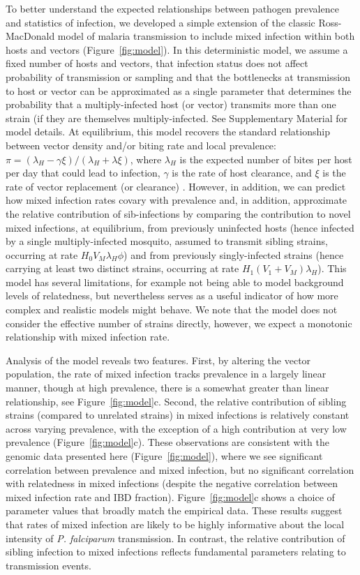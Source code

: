 \documentclass[9pt,lineno]{elife}
\begin{document}
To better understand the expected relationships between pathogen prevalence and statistics of infection, we developed a simple extension of the classic Ross-MacDonald model \citep{Smith2012} of malaria transmission to include mixed infection within both hosts and vectors (Figure~\ref{fig:model}). In this deterministic model, we assume a fixed number of hosts and vectors, that infection status does not affect probability of transmission or sampling and that the bottlenecks at transmission to host or vector can be approximated as a single parameter that determines the probability that a multiply-infected host (or vector) transmits more than one strain (if they are themselves multiply-infected.  See Supplementary Material for model details.  At equilibrium, this model recovers the standard relationship between vector density and/or biting rate and local prevalence: $\pi = (\lambda_H - \gamma \xi)/(\lambda_H + \lambda \xi)$, where $\lambda_H$ is the expected number of bites per host per day that could lead to infection, $\gamma$ is the rate of host clearance, and $\xi$ is the rate of vector replacement (or clearance) .  However, in addition, we  can predict how mixed infection rates covary with prevalence and, in addition, approximate the relative contribution of sib-infections by comparing the contribution to novel mixed infections, at equilibrium, from previously uninfected hosts (hence infected by a single multiply-infected mosquito, assumed to transmit sibling strains, occurring at rate $H_0 V_M \lambda_H \phi$) and from previously singly-infected strains (hence carrying at least two distinct strains, occurring at rate $H_1 (V_1 + V_M) \lambda_H$).  This model has several limitations, for example not being able to model background levels of relatedness, but nevertheless serves as a useful indicator of how more complex and realistic models might behave.  We note that the model does not consider the effective number of strains directly, however, we expect a monotonic relationship with mixed infection rate.

Analysis of the model reveals two features.  First, by altering the vector population, the rate of mixed infection tracks prevalence in a largely linear manner, though at high prevalence, there is a somewhat greater than linear relationship, see Figure~\ref{fig:model}c.  Second, the relative contribution of sibling strains (compared to unrelated strains) in mixed infections is relatively constant across varying prevalence, with the exception of a  high contribution at very low prevalence (Figure~\ref{fig:model}c).  These observations are consistent with the genomic data presented here (Figure~\ref{fig:model}), where we see significant correlation between prevalence and mixed infection, but no significant correlation with relatedness in mixed infections (despite the negative correlation between mixed infection rate and IBD fraction).  Figure~\ref{fig:model}c shows a choice of parameter values that broadly match the empirical data.  These results suggest that rates of mixed infection are likely to be highly informative about the local intensity of {\it P. falciparum} transmission.  In contrast, the relative contribution of sibling infection to mixed infections reflects fundamental parameters relating to transmission events.
\end{document}
